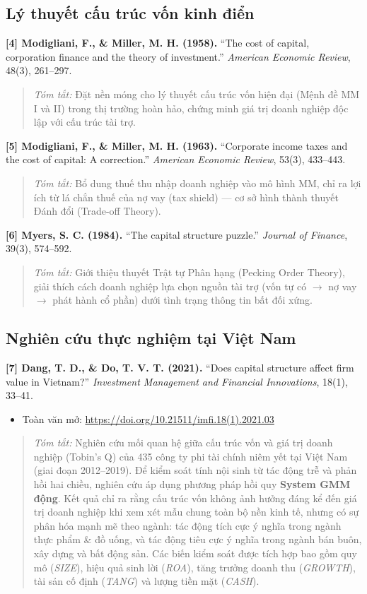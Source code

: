 \documentclass[12pt,a4paper]{article}
\begin{document}
\subsection*{Lý thuyết cấu trúc vốn kinh điển}

\noindent\textbf{[4] Modigliani, F., \& Miller, M. H. (1958).} ``The cost of capital, corporation finance and the theory of investment.'' \textit{American Economic Review}, 48(3), 261--297.
\begin{quote}
\textit{Tóm tắt:} Đặt nền móng cho lý thuyết cấu trúc vốn hiện đại (Mệnh đề MM I và II) trong thị trường hoàn hảo, chứng minh giá trị doanh nghiệp độc lập với cấu trúc tài trợ.
\end{quote}

\noindent\textbf{[5] Modigliani, F., \& Miller, M. H. (1963).} ``Corporate income taxes and the cost of capital: A correction.'' \textit{American Economic Review}, 53(3), 433--443.
\begin{quote}
\textit{Tóm tắt:} Bổ dung thuế thu nhập doanh nghiệp vào mô hình MM, chỉ ra lợi ích từ lá chắn thuế của nợ vay (tax shield) --- cơ sở hình thành thuyết Đánh đổi (Trade-off Theory).
\end{quote}

\noindent\textbf{[6] Myers, S. C. (1984).} ``The capital structure puzzle.'' \textit{Journal of Finance}, 39(3), 574--592.
\begin{quote}
\textit{Tóm tắt:} Giới thiệu thuyết Trật tự Phân hạng (Pecking Order Theory), giải thích cách doanh nghiệp lựa chọn nguồn tài trợ (vốn tự có $\rightarrow$ nợ vay $\rightarrow$ phát hành cổ phần) dưới tình trạng thông tin bất đối xứng.
\end{quote}

\subsection*{Nghiên cứu thực nghiệm tại Việt Nam}

\noindent\textbf{[7] Dang, T. D., \& Do, T. V. T. (2021).} ``Does capital structure affect firm value in Vietnam?'' \textit{Investment Management and Financial Innovations}, 18(1), 33--41.
\begin{itemize}
    \item Toàn văn mở: \url{https://doi.org/10.21511/imfi.18(1).2021.03}
\end{itemize}
\begin{quote}
\textit{Tóm tắt:} Nghiên cứu mối quan hệ giữa cấu trúc vốn và giá trị doanh nghiệp (Tobin's Q) của 435 công ty phi tài chính niêm yết tại Việt Nam (giai đoạn 2012--2019). Để kiểm soát tính nội sinh từ tác động trễ và phản hồi hai chiều, nghiên cứu áp dụng phương pháp hồi quy \textbf{System GMM động}. Kết quả chỉ ra rằng cấu trúc vốn không ảnh hưởng đáng kể đến giá trị doanh nghiệp khi xem xét mẫu chung toàn bộ nền kinh tế, nhưng có sự phân hóa mạnh mẽ theo ngành: tác động tích cực ý nghĩa trong ngành thực phẩm \& đồ uống, và tác động tiêu cực ý nghĩa trong ngành bán buôn, xây dựng và bất động sản. Các biến kiểm soát được tích hợp bao gồm quy mô (\textit{SIZE}), hiệu quả sinh lời (\textit{ROA}), tăng trưởng doanh thu (\textit{GROWTH}), tài sản cố định (\textit{TANG}) và lượng tiền mặt (\textit{CASH}).
\end{quote}
\end{document}

